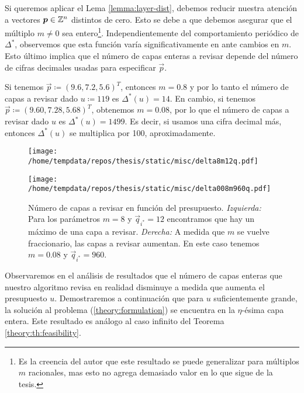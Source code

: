 Si queremos aplicar el Lema \ref{lemma:layer-dist}, debemos reducir nuestra atención a vectores
$\boldsymbol{p} \in \mathbb{Z}^n$ distintos de cero. Esto se debe a que debemos asegurar que el múltiplo $m \neq 0$
sea entero\footnote{Es la creencia del autor que este resultado se puede generalizar para múltiplos
$m$ racionales, mas esto no agrega demasiado valor en lo que sigue de la tesis.}. Independientemente
del comportamiento periódico de $\Delta^*$, observemos que esta función varía significativamente en
ante cambios en $m$. Esto último implica que el número de capas enteras a revisar depende del número
de cifras decimales usadas para especificar $\vec{p}$.

\begin{example}
	\label{ex:decimals}
	Si tenemos $\vec{p} \coloneq (9.6, 7.2, 5.6)^T$, entonces $m = 0.8$ y por lo tanto el número de
	capas a revisar dado $u \coloneq 119$ es $\Delta^*(u) = 14$. En cambio, si tenemos $\vec{p} \coloneq
	(9.60, 7.28, 5.68)^T$, obtenemos $m = 0.08$, por lo que el número de capas a revisar dado $u$ es
	$\Delta^*(u) = 1499$. Es decir, si usamos una cifra decimal más, entonces $\Delta^*(u)$ se
	multiplica por 100, aproximadamente.
\end{example}

\begin{figure}[htbp]
  \centering

  \begin{minipage}[t]{0.48\textwidth}
    \centering
    \texttt{[image: /home/tempdata/repos/thesis/static/misc/delta8m12q.pdf]}
  \end{minipage}
  \hfill
  \begin{minipage}[t]{0.48\textwidth}
    \centering
    \texttt{[image: /home/tempdata/repos/thesis/static/misc/delta008m960q.pdf]}
  \end{minipage}

  \caption{Número de capas a revisar en función del presupuesto. \textit{Izquierda: }Para los
	  parámetros $m = 8$ y $\vec{q}_{i^*} = 12$ encontramos que hay un máximo de una capa a revisar.
	\textit{Derecha: } A medida que $m$ se vuelve fraccionario, las capas a revisar aumentan. En
		este caso tenemos $m = 0.08$ y $\vec{q}_{i^*} = 960$.}
\end{figure}

Observaremos en el análisis de resultados que el número de capas enteras que nuestro algoritmo
revisa en realidad disminuye a medida que aumenta el presupuesto $u$. Demostraremos a continuación
que para $u$ suficientemente grande, la solución al problema (\ref{theory:formulation}) se encuentra
en la $\eta$-ésima capa entera. Este resultado es análogo al caso infinito del Teorema
\ref{theory:th:feasibility}.

